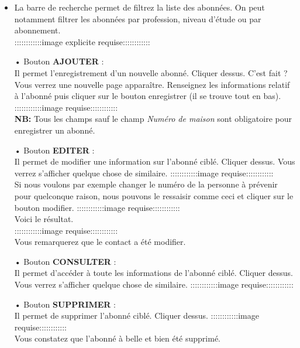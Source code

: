\documentclass[12pt,a4paper]{article}
\begin{document}
\begin{itemize}
\item La barre de recherche permet de filtrez la liste des abonnées. On peut notamment filtrer 
les abonnées par profession, niveau d'étude ou par abonnement.\\
::::::::::::image explicite requise::::::::::::\\

\item[•] Bouton \textbf{AJOUTER} : \\
Il permet l'enregistrement d'un nouvelle abonné. Cliquer dessus. C'est fait ? Vous verrez
une nouvelle page apparaître. Renseignez les informations relatif à l'abonné puis cliquer sur le
bouton enregistrer (il se trouve tout en bas).\\
::::::::::::image requise::::::::::::\\

\textbf{NB:} Tous les champs sauf le champ \textit{Numéro de maison} sont obligatoire pour enregistrer un abonné.

\item[•] Bouton \textbf{EDITER} : \\
Il permet de modifier une information sur l'abonné ciblé. Cliquer dessus. Vous verrez s'afficher quelque chose de similaire.
::::::::::::image requise::::::::::::\\
Si nous voulons par exemple changer le numéro de la personne à prévenir pour quelconque 
raison, nous pouvons le ressaisir comme ceci et cliquer sur le bouton modifier.
::::::::::::image requise::::::::::::\\
Voici le résultat.\\
::::::::::::image requise::::::::::::\\
Vous remarquerez que le contact a été modifier.
\item[•] Bouton \textbf{CONSULTER} : \\
Il permet d'accéder à toute les informations de l'abonné ciblé. Cliquer dessus. Vous verrez
s'afficher quelque chose de similaire.
::::::::::::image requise::::::::::::\\
\item[•] Bouton \textbf{SUPPRIMER} : \\
Il permet de supprimer l'abonné ciblé. Cliquer dessus. 
::::::::::::image requise::::::::::::\\
Vous constatez que l'abonné à belle et bien été supprimé.
\end{itemize}
\end{document}
